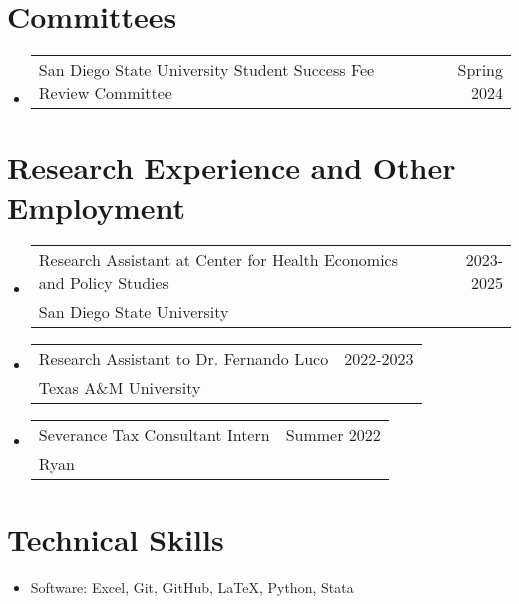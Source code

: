 \documentclass[letterpaper,11pt]{article}
\makeatletter
\newcommand{\resumeSubheading}[4]{
  \vspace{-2pt}
    \item
    \begin{tabular*}{0.97\textwidth}[t]{l@{\extracolsep{\fill}}r}
      #1 & #2 \\
      \hspace{0.15in}#3 & {#4} \\
    \end{tabular*}\vspace{-7pt}
}
\newcommand{\resumeSubSubheading}[2]{
    \item
    \begin{tabular*}{0.97\textwidth}{l@{\extracolsep{\fill}}r}
      #1 & #2 \\
    \end{tabular*}\vspace{-7pt}
}
\newcommand{\resumeSubHeadingListStart}{\begin{itemize}[leftmargin=0.15in, label={}]}
\newcommand{\resumeSubHeadingListEnd}{\end{itemize}}
\makeatother
\begin{document}
\section{Committees}
    \resumeSubHeadingListStart
      \resumeSubSubheading{San Diego State University Student Success
      Fee Review Committee}{Spring 2024}
    \resumeSubHeadingListEnd

\section{Research Experience and Other Employment}
    \resumeSubHeadingListStart
      \resumeSubheading{Research Assistant at Center for 
      Health Economics and Policy Studies}{2023-2025}
      {San Diego State University}{}

      \resumeSubheading{Research Assistant to Dr. Fernando Luco}{2022-2023}
      {Texas A\&M University}{}

      \resumeSubheading{Severance Tax Consultant Intern}{Summer 2022}{Ryan}{}
    \resumeSubHeadingListEnd

%
\section{Technical Skills}

 \begin{itemize}[leftmargin=0.15in, label={}]
    \item{
     Software{: Excel, Git, GitHub, \LaTeX, Python, Stata} \\
    }
 \end{itemize}
\end{document}
